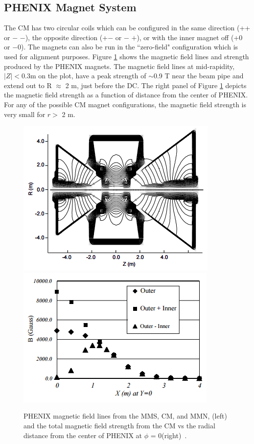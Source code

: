 \subsection{PHENIX Magnet System}
 The CM has two circular coils which can be configured in the same direction (++ or $-$ $-$), the opposite direction (+$-$ or $-$ $+$), or with the inner magnet off (+0 or $-$0). The magnets can also be run in the ``zero-field" configuration which is used for alignment purposes. Figure \ref{fig:magnet_figures} shows the magnetic field lines and strength produced by the PHENIX magnets. The magnetic field lines at mid-rapidity, $|Z| < 0.3$m on the plot, have a peak strength of $\sim$0.9 T near the beam pipe and extend out to R $\approx$ 2 m, just before the DC. The right panel of Figure \ref{fig:magnet_figures} depicts the magnetic field strength as a function of distance from the center of PHENIX. For any of the possible CM magnet configurations, the magnetic field strength is very small for $r > $ 2 m.
\begin{figure}[!ht]
\centering
\includegraphics[width=0.45\linewidth]{figs/magnet_map.png}
\includegraphics[width=0.45\linewidth]{figs/magnetic_field_strength.png}
\caption{PHENIX magnetic field lines from the MMS, CM, and MMN, (left) and the total magnetic field strength from the CM vs the radial distance from the center of PHENIX at $\phi$ = 0(right)~\cite{Aronson2003480}.}
\label{fig:magnet_figures}
\end{figure}
